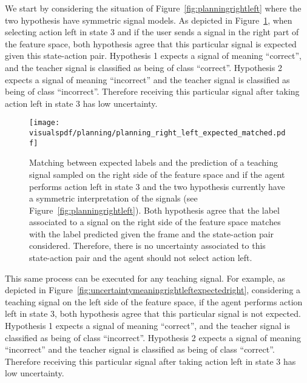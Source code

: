 We start by considering the situation of Figure~\ref{fig:planningrightleft} where the two hypothesis have symmetric signal models. As depicted in Figure~\ref{fig:uncertaintymeaningrightleftexpectedleft}, when selecting action left in state 3 and if the user sends a signal in the right part of the feature space, both hypothesis agree that this particular signal is expected given this state-action pair. Hypothesis 1 expects a signal of meaning ``correct'', and the teacher signal is classified as being of class ``correct''. Hypothesis 2 expects a signal of meaning ``incorrect'' and the teacher signal is classified as being of class ``incorrect''. Therefore receiving this particular signal after taking action left in state 3 has low uncertainty.

\begin{figure}[!htbp]
  \centering
  \texttt{[image: \\visualspdf/planning/planning\_right\_left\_expected\_matched.pdf]}
  \caption{Matching between expected labels and the prediction of a teaching signal sampled on the right side of the feature space and if the agent performs action left in state 3 and the two hypothesis currently have a symmetric interpretation of the signals (see Figure~\ref{fig:planningrightleft}). Both hypothesis agree that the label associated to a signal on the right side of the feature space matches with the label predicted given the frame and the state-action pair considered. Therefore, there is no uncertainty associated to this state-action pair and the agent should not select action left.}
  \label{fig:uncertaintymeaningrightleftexpectedleft}
\end{figure}

This same process can be executed for any teaching signal. For example, as depicted in Figure~\ref{fig:uncertaintymeaningrightleftexpectedright}, considering a teaching signal on the left side of the feature space, if the agent performs action left in state 3, both hypothesis agree that this particular signal is not expected. Hypothesis 1 expects a signal of meaning ``correct'', and the teacher signal is classified as being of class ``incorrect''. Hypothesis 2 expects a signal of meaning ``incorrect'' and the teacher signal is classified as being of class ``correct''. Therefore receiving this particular signal after taking action left in state 3 has low uncertainty.

